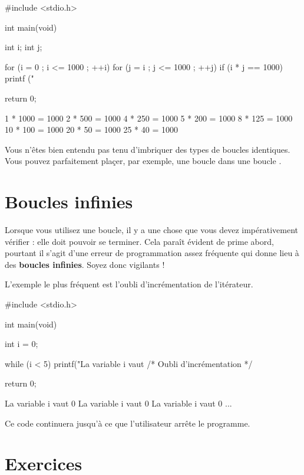 \begin{C}
#include <stdio.h>


int main(void)
{
    int i;
    int j;

    for (i = 0 ; i <= 1000 ; ++i)
    {
        for (j = i ; j <= 1000 ; ++j)
            if (i * j == 1000) 
                printf ("%
    }

    return 0;
}
\end{C}

\begin{C}
1 * 1000 = 1000 
2 * 500 = 1000 
4 * 250 = 1000 
5 * 200 = 1000 
8 * 125 = 1000 
10 * 100 = 1000 
20 * 50 = 1000 
25 * 40 = 1000 
\end{C}

\begin{infobox}
  Vous n'êtes bien entendu pas tenu
d'imbriquer des types de boucles identiques. Vous pouvez parfaitement
plaçer, par exemple, une boucle  dans une boucle
.
\end{infobox}

\section{Boucles infinies}
\label{boucles-infinies}

Lorsque vous utilisez une boucle, il y a une chose que vous
devez impérativement vérifier : elle doit pouvoir se terminer. Cela
paraît évident de prime abord, pourtant il s'agit d'une erreur de
programmation assez fréquente qui donne lieu à des \textbf{boucles
infinies}. Soyez donc vigilants !

L'exemple le plus fréquent est l'oubli d'incrémentation de l'itérateur.

\begin{C}
#include <stdio.h>

int main(void)
{
    int i = 0;

    while (i < 5)
    {
        printf("La variable i vaut %
        /* Oubli d'incrémentation */
    }

    return 0;
}
\end{C}

\begin{C}
La variable i vaut 0
La variable i vaut 0
La variable i vaut 0
...
\end{C}

Ce code continuera jusqu'à ce que l'utilisateur arrête le programme.

\section{Exercices}
\label{exercices-2}

